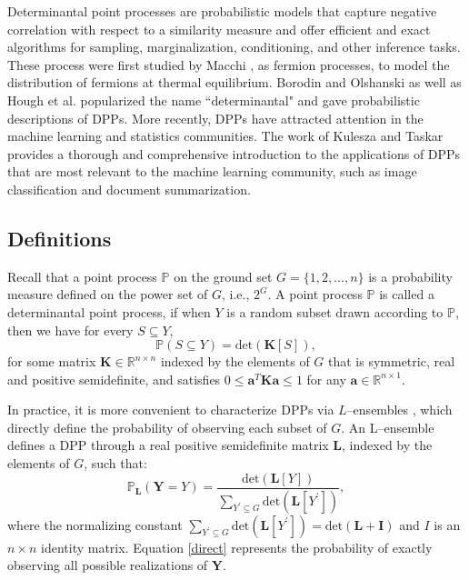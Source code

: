 \documentclass[]{interact}
\theoremstyle{plain}%
\theoremstyle{definition}
\theoremstyle{remark}
\newcommand{\matr}[1]{\bm{#1}}
\begin{document}
Determinantal point processes are probabilistic models that capture negative correlation with respect to a similarity measure and offer efficient and exact algorithms for sampling, marginalization, conditioning, and other inference tasks. These process were first studied by Macchi \cite{Macchi}, as fermion processes, to model the distribution of fermions at thermal equilibrium. Borodin and Olshanski \cite{Borodin2000} as well as Hough et al. \cite{Hough} popularized the name ``determinantal" and gave probabilistic descriptions of DPPs. More recently, DPPs have attracted attention in the machine learning and statistics communities. The work of Kulesza and Taskar \cite{Kulesza and Taskar} provides a thorough and comprehensive introduction to the applications of DPPs that are most relevant to the machine learning community, such as image classification and document summarization.

\subsection{Definitions}
Recall that a point process $\mathbb{P}$ on the ground set $G = \{1, 2, ..., n\}$ is a probability measure defined on the power set of $G$, i.e., $2^{G}$. A point process $\mathbb{P}$ is called a determinantal point process, if when $Y$ is a random subset drawn according to $\mathbb{P}$, then we have for every $S \subseteq Y$,
\begin{equation}\label{marginal}
	\mathbb{P}(S \subseteq Y) = \text{det}(\matr{K}[S]),
\end{equation} for some matrix $\matr{K} \in \mathbb{R}^{n \times n}$
indexed by the elements of $G$ that is symmetric, real and positive semidefinite, and satisfies $0 \leq \bm{a}^T \matr{K} \bm{a} \leq 1$ for any $\bm{a} \in \mathbb{R}^{n \times 1}$.

In practice, it is more convenient to characterize DPPs via $L$--ensembles \cite{Borodin2005,Kulesza and Taskar}, which directly define the probability of observing each subset of $G$. An L--ensemble defines a DPP through a real positive semidefinite matrix $\matr{L}$, indexed by the elements of $G$, such that:
\begin{equation}\label{direct}
	\mathbb{P}_{\matr{L}}(\mathbf{Y} = Y) = \frac{\text{det}(\matr{L}[Y])}{\sum_{Y^\prime \subseteq G} \text{det}(\matr{L}[Y^\prime])},
\end{equation} where the normalizing constant $\sum_{Y^\prime \subseteq G} \text{det}(\matr{L}[Y^\prime]) = \text{det}(\matr{L} + \matr{I})$ and $I$ is an $n \times n$ identity matrix. Equation \eqref{direct} represents the probability of exactly observing all possible realizations of $\mathbf{Y}$. 
\end{document}
